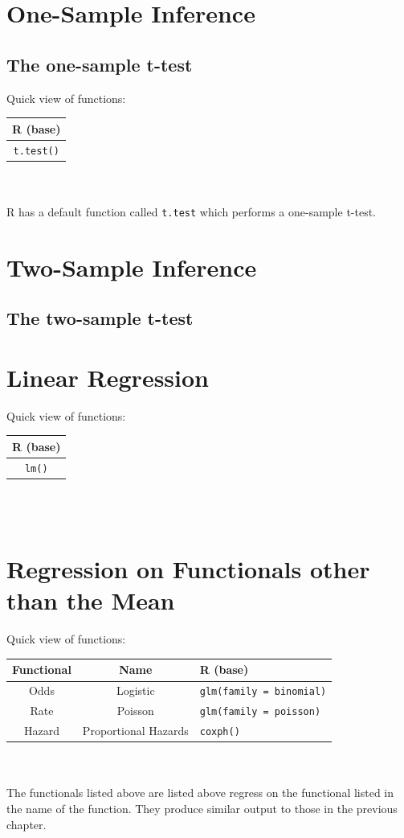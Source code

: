 \documentclass[11pt,letterpaper,fleqn]{report}
\begin{document}
\chapter{One-Sample Inference}

\section{The one-sample t-test}
Quick view of functions:
\begin{tabular}{c}
R (base)\\
\hline
\texttt{t.test()}\\
\end{tabular}\\
\\

R has a default function called \texttt{t.test} which performs a one-sample t-test. 
\chapter{Two-Sample Inference}

\section{The two-sample t-test}


\chapter{Linear Regression}
Quick view of functions:
\begin{tabular}{c}
R (base) \\
\hline
\texttt{lm()}\\
\end{tabular}\\
\\

\chapter{Regression on Functionals other than the Mean}
Quick view of functions:
\begin{tabular}{cc|l}
Functional & Name & R (base)\\
\hline
Odds & Logistic & \texttt{glm(family = binomial)}\\
Rate & Poisson & \texttt{glm(family = poisson)}\\
Hazard & Proportional Hazards & \texttt{coxph()}\\
\end{tabular}\\
\\
The functionals listed above are listed above regress on the functional listed in the name of the function. They produce similar output to those in the previous chapter. 
\end{document}
